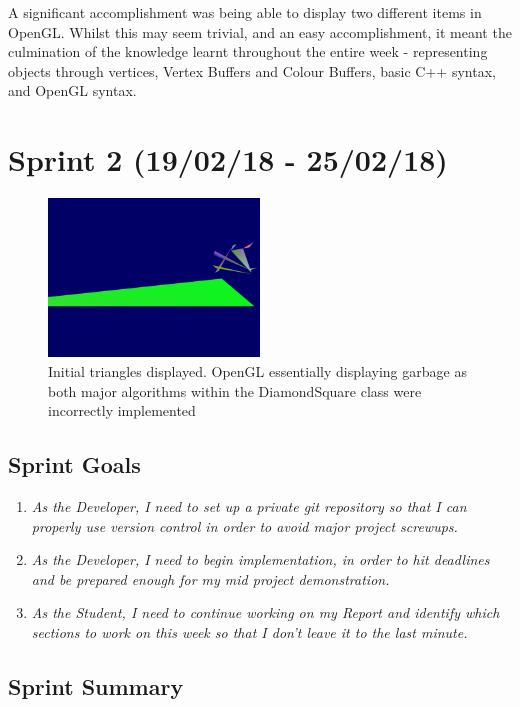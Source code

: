 \documentclass[a4paper,10pt]{report}
\begin{document}
A significant accomplishment was being able to display two different items in OpenGL. Whilst this may seem trivial, and an easy accomplishment, it meant the culmination of the knowledge learnt throughout the entire week - representing objects through vertices, Vertex Buffers and Colour Buffers, basic C++ syntax, and OpenGL syntax.\medskip

\clearpage
\section{Sprint 2 (19/02/18 - 25/02/18)}

\begin{figure}[h!]
    \centering
  \includegraphics[width=0.5\textwidth]{Images/Sprint-Images/Sprint2-1.png}
 \caption{Initial triangles displayed. OpenGL essentially displaying garbage as both major algorithms within the DiamondSquare class were incorrectly implemented}
 \label{fig:sprint2-1}
\end{figure}

\subsection{Sprint Goals}
\begin{enumerate}
    \item \textit{As the Developer, I need to set up a private git repository so that I can properly use version control in order to avoid major project screwups.
    }
    \item \textit{As the Developer, I need to begin implementation, in order to hit deadlines and be prepared enough for my mid project demonstration.}
    \item\textit{As the Student, I need to continue working on my Report and identify which sections to work on this week so that I don't leave it to the last minute.}
    
\end{enumerate}

\subsection{Sprint Summary}
\end{document}
